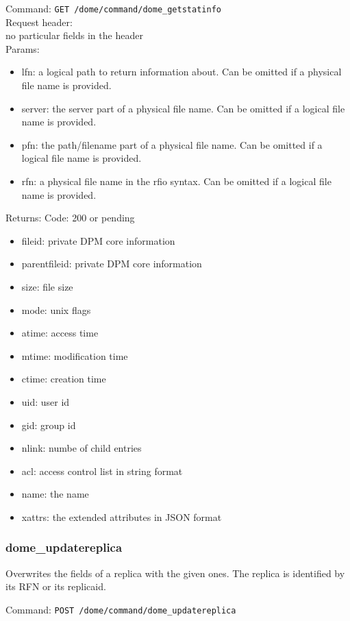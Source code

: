 \documentclass[a4paper,10pt]{scrreprt}
\begin{document}
Command:
\lstinline"GET /dome/command/dome_getstatinfo"\\

Request header:\\
no particular fields in the header\\

Params:
\begin{itemize}
 \item lfn: a logical path to return information about. Can be omitted if a physical file name is provided.
 \item server: the server part of a physical file name. Can be omitted if a logical file name is provided.
 \item pfn: the path/filename part of a physical file name. Can be omitted if a logical file name is provided.
 \item rfn: a physical file name in the rfio syntax. Can be omitted if a logical file name is provided.
\end{itemize}

Returns:
Code: 200 or pending
\begin{itemize}
 \item fileid: private DPM core information
 \item parentfileid: private DPM core information
 \item size: file size
 \item mode: unix flags
 \item atime: access time
 \item mtime: modification time
 \item ctime: creation time
 \item uid: user id
 \item gid: group id
 \item nlink: numbe of child entries
 \item acl: access control list in string format
 \item name: the name
 \item xattrs: the extended attributes in JSON format
\end{itemize}

\subsubsection{dome\_updatereplica}
Overwrites the fields of a replica with the given ones. The replica is identified by its RFN or its replicaid.

Command:
\lstinline"POST /dome/command/dome_updatereplica"\\
\end{document}
